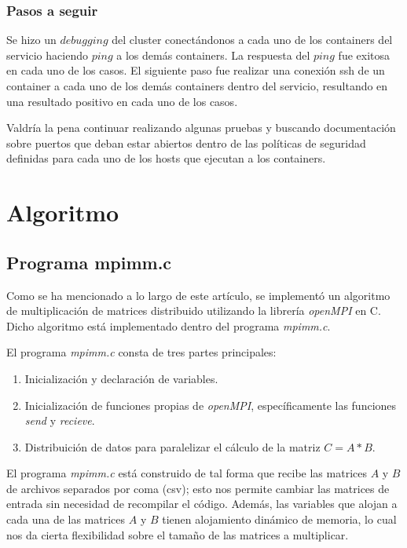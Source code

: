 \documentclass[DIV=calc, paper=letter, fontsize=11pt, twocolumn]{scrartcl}
\begin{document}
\subsubsection{Pasos a seguir}

Se hizo un $debugging$ del cluster conectándonos a cada uno de los containers del servicio haciendo $ping$ a los demás containers. La respuesta del $ping$ fue exitosa en cada uno de los casos. El siguiente paso fue realizar una conexión ssh de un container a cada uno de los demás containers dentro del servicio, resultando en una resultado positivo en cada uno de los casos.

Valdría la pena continuar realizando algunas pruebas y buscando documentación sobre puertos que deban estar abiertos dentro de las políticas de seguridad definidas para cada uno de los hosts que ejecutan a los containers.

\section{Algoritmo}

\subsection{Programa mpimm.c}

Como se ha mencionado a lo largo de este artículo, se implementó un algoritmo de multiplicación de matrices distribuido utilizando la librería \textit{openMPI} en C. Dicho algoritmo está implementado dentro del programa \textit{mpimm.c}.

El programa \textit{mpimm.c} consta de tres partes principales:

\begin{enumerate}
    \item Inicialización y declaración de variables.
    \item Inicialización de funciones propias de \textit{openMPI}, específicamente las funciones \textit{send} y \textit{recieve}.
    \item Distribuición de datos para paralelizar el cálculo de la matriz $C = A * B$.
\end{enumerate}

El programa \textit{mpimm.c} está construido de tal forma que recibe las matrices $A$ y $B$ de archivos separados por coma (csv); esto nos permite cambiar las matrices de entrada sin necesidad de recompilar el código. Además, las variables que alojan a cada una de las matrices $A$ y $B$ tienen alojamiento dinámico de memoria, lo cual nos da cierta flexibilidad sobre el tamaño de las matrices a multiplicar.
\end{document}
